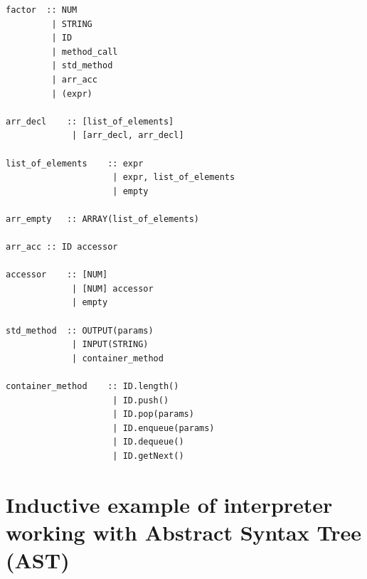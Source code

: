 \documentclass{article}
\begin{document}
\begin{verbatim}
factor  :: NUM
         | STRING
         | ID
         | method_call
         | std_method
         | arr_acc
         | (expr)

arr_decl    :: [list_of_elements]
             | [arr_decl, arr_decl]

list_of_elements    :: expr
                     | expr, list_of_elements
                     | empty

arr_empty   :: ARRAY(list_of_elements)

arr_acc :: ID accessor

accessor    :: [NUM]
             | [NUM] accessor
             | empty

std_method  :: OUTPUT(params)
             | INPUT(STRING)
             | container_method

container_method    :: ID.length()
                     | ID.push()
                     | ID.pop(params)
                     | ID.enqueue(params)
                     | ID.dequeue()
                     | ID.getNext()

\end{verbatim}

\section{Inductive example of interpreter working with Abstract Syntax Tree (AST)}
\end{document}

